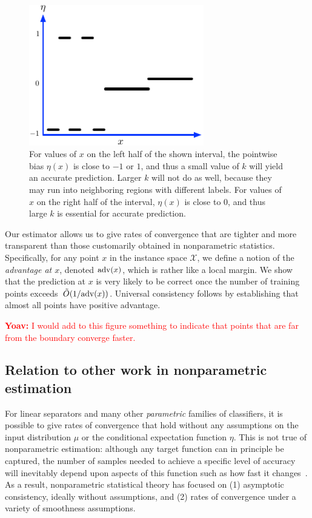 \documentclass{article}
\def\X{{\mathcal X}}
\def\adv{{\rm adv}}
\begin{document}
\begin{figure}
\begin{center}
\includegraphics[width=3in]{figs/adaptive-rationale.pdf}
\end{center}
\caption{For values of $x$ on the left half of the shown interval, the
  pointwise bias $\eta(x)$ is close to $-1$ or $1$, and thus a small value of $k$ will yield an accurate prediction. Larger $k$ will not do as well, because they may run into neighboring regions with different labels. For values of $x$ on the right half of the interval, $\eta(x)$ is close to $0$, and thus large $k$ is essential for accurate prediction.}
\label{fig:rationale}
\end{figure}

Our estimator allows us to give rates of convergence that are tighter and more 
transparent than those customarily obtained in nonparametric statistics. Specifically, for any point $x$ in the instance space $\X$, we define a notion of the {\it advantage at $x$}, denoted $\adv(x)$, which is rather like a local margin. We show that the prediction at $x$ is very likely to be correct once the number of training points exceeds~$\tilde{O}(1/\adv(x))$. Universal consistency follows by establishing that almost all points have positive advantage.

\textcolor{red}{{\bf Yoav:} I would add to this figure something to indicate that
points that are far from the boundary converge faster.}
  
\subsection{Relation to other work in nonparametric estimation}

For linear separators and many other {\it parametric} families of classifiers, it is possible to give rates of convergence that hold without any assumptions on the input distribution $\mu$ or the conditional expectation function $\eta$. This is not true of nonparametric estimation: although any target function can in principle be captured, the number of samples needed to achieve a specific level of accuracy will inevitably depend upon aspects of this function such as how fast it changes~\cite[chapter 7]{DGL96}. As a result, nonparametric statistical theory has focused on (1) asymptotic consistency, ideally without assumptions, and (2) rates of convergence under a variety of smoothness assumptions.
\end{document}
